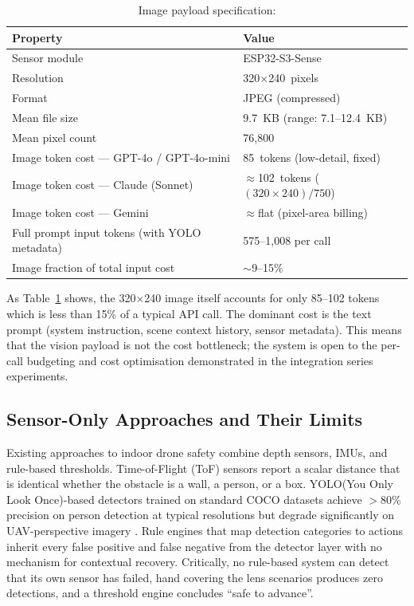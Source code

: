 \begin{table}[ht]
  \caption{Image payload specification: }
  \label{tab:ch2_image_spec}
  \centering
  \small
  \begin{tabular}{ll}
    \toprule
    Property & Value \\
    \midrule
    Sensor module & ESP32-S3-Sense \\
    Resolution & 320$\times$240~pixels \\
    Format & JPEG (compressed) \\
    Mean file size & 9.7~KB (range: 7.1--12.4~KB) \\
    Mean pixel count & 76,800 \\
    \midrule
    Image token cost --- GPT-4o / GPT-4o-mini & 85~tokens (low-detail, fixed) \\
    Image token cost --- Claude (Sonnet) & $\approx$102~tokens ($(320 \times 240)/750$) \\
    Image token cost --- Gemini & $\approx$flat (pixel-area billing) \\
    \midrule
    Full prompt input tokens (with YOLO metadata) & 575--1,008 per call \\
    Image fraction of total input cost & $\sim$9--15\% \\
    \bottomrule
  \end{tabular}
\end{table}

As Table~\ref{tab:ch2_image_spec} shows, the 320$\times$240 image itself accounts for only 85--102 tokens which is less than 15\% of a typical API call.
The dominant cost is the text prompt (system instruction, scene context history, sensor metadata). 
This means that the vision payload is not the cost bottleneck; the system is open to the per-call budgeting and cost optimisation demonstrated in the integration series experiments.

\subsection{Sensor-Only Approaches and Their Limits}
\label{sec:ch2_problem_sensors}

Existing approaches to indoor drone safety combine depth sensors, IMUs, and rule-based thresholds. 
Time-of-Flight (ToF) sensors report a scalar distance that is identical whether the obstacle is a wall, a person, or a box.
YOLO(You Only Look Once)-based detectors trained on standard COCO datasets achieve $>$80\% precision on person detection at typical resolutions but degrade significantly on UAV-perspective imagery \cite{persondetectionuav2025,kim2024yoloihd}. 
Rule engines that map detection categories to actions inherit every false positive and false negative from the detector layer with no mechanism for contextual recovery. 
Critically, no rule-based system can detect that its own sensor has
failed, hand covering the lens scenarios produces zero detections, and a threshold engine concludes ``safe to advance''.

